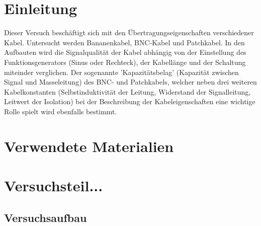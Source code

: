 \documentclass[12pt,a4paper]{article}
\begin{document}
\newpage\section{Einleitung}
Dieser Versuch beschäftigt sich mit den Übertragungseigenschaften verschiedener Kabel. Untersucht werden Bananenkabel, BNC-Kabel und Patchkabel.\newline
In den Aufbauten wird die Signalqualität der Kabel abhängig von der Einstellung des Funktionsgenerators (Sinus oder Rechteck), der Kabellänge und der Schaltung miteinder verglichen.\newline
Der sogenannte 'Kapazitätsbelag' (Kapazität zwischen Signal und Masseleitung) des BNC- und Patchkabels, welcher neben drei weiteren Kabelkonstanten (Selbstinduktivität der Leitung, Widerstand der Signalleitung, Leitwert der Isolation) bei der Beschreibung der Kabeleigenschaften eine wichtige Rolle spielt wird ebenfalls bestimmt.

\section{Verwendete Materialien}
\section{Versuchsteil...}
\subsection{Versuchsaufbau}
\end{document}
